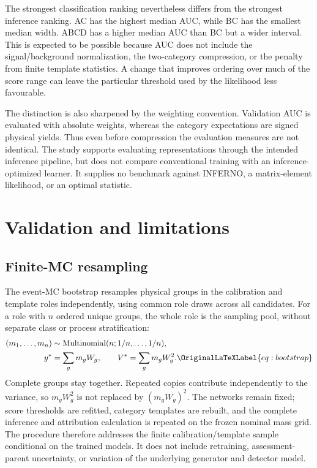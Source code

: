 \documentclass[aps,prd,reprint,superscriptaddress,nofootinbib,longbibliography,floatfix]{revtex4-2}
\let\label\OriginalLaTeXLabel
\begin{document}
The strongest classification ranking nevertheless differs from the
strongest inference ranking. AC has the highest median AUC, while BC has
the smallest median width. ABCD has a higher median AUC than BC but a wider
interval. This is expected to be possible because AUC does not include
the signal/background normalization, the two-category compression, or the
penalty from finite template statistics. A change that improves ordering
over much of the score range can leave the particular threshold used by
the likelihood less favourable.

The distinction is also sharpened by the weighting convention. Validation
AUC is evaluated with absolute weights, whereas the category expectations
are signed physical yields. Thus even before compression the evaluation
measures are not identical. The study supports evaluating representations
through the intended inference pipeline, but does not compare conventional
training with an inference-optimized learner. It supplies no benchmark
against INFERNO, a matrix-element likelihood, or an optimal statistic.

\section{Validation and limitations}
\label{sec:validation}

\subsection{Finite-MC resampling}

The event-MC bootstrap resamples physical groups in the calibration and
template roles independently, using common role draws across all candidates.
For a role with $n$ ordered unique groups, the whole role is the sampling
pool, without separate class or process stratification:
\begin{align}
 (m_1,\ldots,m_n)&\sim\operatorname{Multinomial}
                 (n;1/n,\ldots,1/n),\nonumber\\
 y^*&=\sum_g m_gW_g,\qquad V^*=\sum_g m_gW_g^2.
 \label{eq:bootstrap}
\end{align}
Complete groups stay together. Repeated copies contribute independently to
the variance, so $m_gW_g^2$ is not replaced by $(m_gW_g)^2$.
The
networks remain fixed; score thresholds are refitted, category templates
are rebuilt, and the complete inference and attribution calculation is
repeated on the frozen nominal mass grid. The procedure therefore addresses
the finite calibration/template sample conditional on the trained models.
It does not include retraining, assessment-parent uncertainty, or variation
of the underlying generator and detector model.
\end{document}

